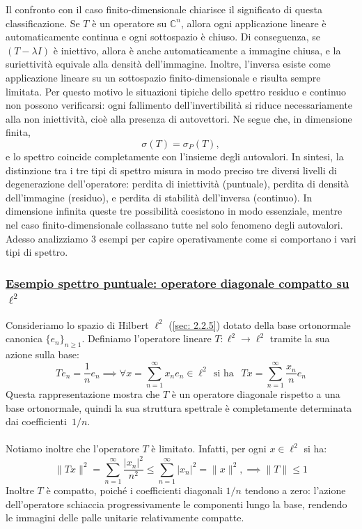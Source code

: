 \documentclass[a4paper,12pt]{report}
\begin{document}
Il confronto con il caso finito-dimensionale chiarisce il significato di questa classificazione. Se $T$ è un operatore su $\mathbb{C}^n$, allora ogni applicazione lineare è automaticamente continua e ogni sottospazio è chiuso. Di conseguenza, se $(T-\lambda I)$ è iniettivo, allora è anche automaticamente a immagine chiusa, e la suriettività equivale alla densità dell’immagine. Inoltre, l’inversa esiste come applicazione lineare su un sottospazio finito-dimensionale e risulta sempre limitata. Per questo motivo le situazioni tipiche dello spettro residuo e continuo non possono verificarsi: ogni fallimento dell’invertibilità si riduce necessariamente alla non iniettività, cioè alla presenza di autovettori. Ne segue che, in dimensione finita,
\[
\sigma(T)=\sigma_P(T),
\]
e lo spettro coincide completamente con l’insieme degli autovalori. In sintesi, la distinzione tra i tre tipi di spettro misura in modo preciso tre diversi livelli di degenerazione dell’operatore: perdita di iniettività (puntuale), perdita di densità dell’immagine (residuo), e perdita di stabilità dell’inversa (continuo). In dimensione infinita queste tre possibilità coesistono in modo essenziale, mentre nel caso finito-dimensionale collassano tutte nel solo fenomeno degli autovalori. Adesso analizziamo 3 esempi per capire operativamente come si comportano i vari tipi di spettro.

\newpage

\subsubsection{\underline{Esempio spettro puntuale: operatore diagonale compatto su $\ell^2$}}

Consideriamo lo spazio di Hilbert $\ell^2$ (\ref{sec: 2.2.5}) dotato della base ortonormale canonica $\{e_n\}_{n\ge 1}$. Definiamo l’operatore lineare $T : \ell^2 \to \ell^2$ tramite la sua azione sulla base:
\[
T e_n = \frac{1}{n} e_n\implies \forall x = \sum_{n=1}^\infty x_n e_n  \in \ell^2 \ \ \text{si ha } \ \ Tx = \sum_{n=1}^\infty \frac{x_n}{n} e_n\]
Questa rappresentazione mostra che $T$ è un operatore diagonale rispetto a una base ortonormale, quindi la sua struttura spettrale è completamente determinata dai \mbox{coefficienti $1/n$.}
\\
\\Notiamo inoltre che l’operatore $T$ è limitato. Infatti, per ogni $x \in \ell^2$ si ha:
\[
\|Tx\|^2 = \sum_{n=1}^\infty \frac{|x_n|^2}{n^2} \le \sum_{n=1}^\infty |x_n|^2 = \|x\|^2,
\implies \|T\|\le 1\]
Inoltre $T$ è compatto, poiché i coefficienti diagonali $1/n$ tendono a zero: l’azione dell’operatore schiaccia progressivamente le componenti lungo la base, rendendo le immagini delle palle unitarie relativamente compatte.
\end{document}
